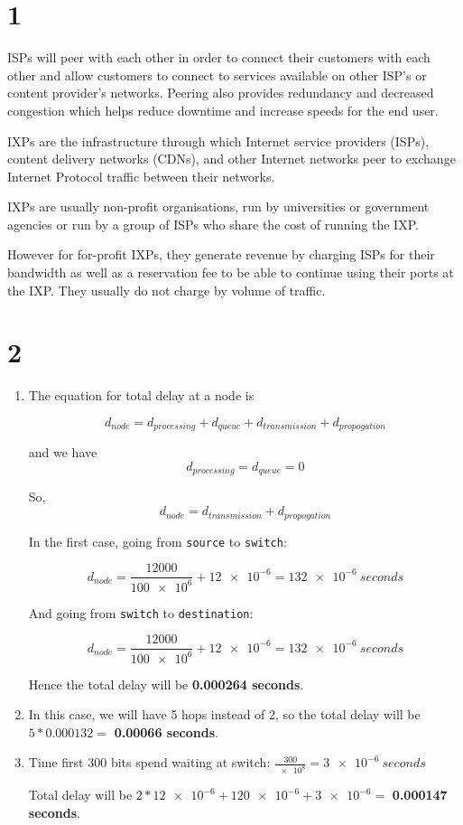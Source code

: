 \section*{1}

ISPs will peer with each other in order to connect their customers with each other and allow customers to connect to services available on other ISP's or content provider's networks. Peering also provides redundancy and decreased congestion which helps reduce downtime and increase speeds for the end user.

IXPs are the infrastructure through which Internet service providers (ISPs), content delivery networks (CDNs), and other Internet networks peer to exchange Internet Protocol traffic between their networks.\cite{IXP}

IXPs are usually non-profit organisations, run by universities or government agencies or run by a group of ISPs who share the cost of running the IXP.

However for for-profit IXPs, they generate revenue by charging ISPs for their bandwidth as well as a reservation fee to be able to continue using their ports at the IXP. They usually do not charge by volume of traffic.\cite{IXP}

\section*{2}
\begin{enumerate}
  \item The equation for total delay at a node is
  
  $$d_{node} = d_{processing} + d_{queue} + d_{transmission} + d_{propogation}$$
  
  and we have $$d_{processing} = d_{queue} = 0$$
  
  So, $$d_{node} = d_{transmission} + d_{propogation}$$
  
  In the first case, going from \texttt{source} to \texttt{switch}:
  
  $$d_{node} = \frac{12000}{\num{100e6}} + \num{12e-6} = \SI{132e-6}{seconds}$$
  
  And going from \texttt{switch} to \texttt{destination}:
  
  $$d_{node} = \frac{12000}{\num{100e6}} + \num{12e-6} = \SI{132e-6}{seconds}$$
  
  Hence the total delay will be \textbf{0.000264 seconds}.
  
  \item In this case, we will have 5 hops instead of 2, so the total delay will be $5 * 0.000132 =$ \textbf{0.00066 seconds}.
  
  \item Time first 300 bits spend waiting at switch: $\frac{300}{\num{e8}} = \SI{3e-6}{seconds}$
  
  Total delay will be $2*\num{12e-6} + \num{120e-6} +  \num{3e-6} =$ \textbf{0.000147 seconds}.
\end{enumerate}


